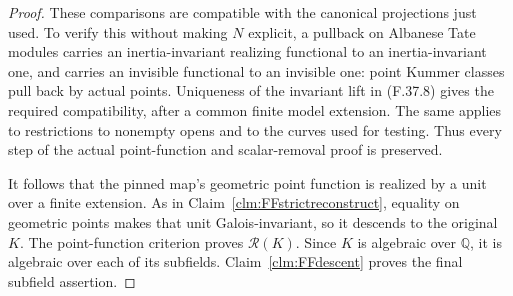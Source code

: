 \documentclass[11pt]{article}
\begin{document}
\begin{proof}
These comparisons are compatible
with the canonical projections just
used. To verify this without making
\(N\) explicit, a pullback on
Albanese Tate modules carries an
inertia-invariant realizing functional
to an inertia-invariant one, and
carries an invisible functional to
an invisible one: point Kummer
classes pull back by actual points.
Uniqueness of the invariant lift
in (F.37.8) gives the required
compatibility, after a common finite
model extension. The same applies
to restrictions to nonempty opens
and to the curves used for testing.
Thus every step of the actual
point-function and scalar-removal
proof is preserved.

It follows that the pinned map's
geometric point function is realized
by a unit over a finite extension.
As in Claim~\ref{clm:FFstrictreconstruct},
equality on geometric points makes
that unit Galois-invariant, so it
descends to the original \(K\).
The point-function criterion
\citep[Theorem~4.18(5)]{FF_CHW2024}
proves \(\mathcal R(K)\).
Since \(K\) is algebraic over
\(\mathbb Q\), it is algebraic
over each of its subfields.
Claim~\ref{clm:FFdescent} proves
the final subfield assertion.
\end{proof}
\end{document}
